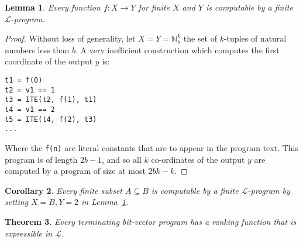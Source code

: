 \documentclass[preprint]{sigplanconf}
\newtheorem{theorem}{Theorem}
\newtheorem{lemma}[theorem]{Lemma}
\newtheorem{corollary}[theorem]{Corollary}
\theoremstyle{definition}
\begin{document}
\begin{lemma}
 \label{lem:l-func}
 Every function $f: X \to Y$ for finite $X$ and $Y$ is computable by a finite $\mathcal{L}$-program.
\end{lemma}

\begin{proof}
Without loss of generality, let $X = Y = \mathbb{N}_b^k$ the set of
$k$-tuples of natural numbers less than $b$.
A very inefficient construction which computes the first coordinate
of the output $y$ is:
%
\begin{verbatim}
t1 = f(0)
t2 = v1 == 1
t3 = ITE(t2, f(1), t1)
t4 = v1 == 2
t5 = ITE(t4, f(2), t3)
...
\end{verbatim}
%
Where the \verb|f(n)| are literal constants that are to appear in the program text.
This program is of length $2b - 1$, and so all $k$ co-ordinates of the output $y$
are computed by a program of size at most $2bk - k$.
\end{proof}

\begin{corollary}
 Every finite subset $A \subseteq B$ is computable by a finite $\mathcal{L}$-program
 by setting $X = B, Y = 2$ in Lemma~\ref{lem:l-func}.
\end{corollary}


\begin{theorem}
\label{thm:l-term}
 Every terminating bit-vector program has a ranking function that is expressible in $\mathcal{L}$.
\end{theorem}
\end{document}
